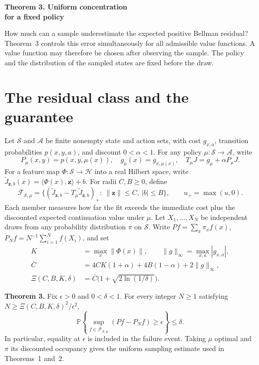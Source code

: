 \documentclass[12pt,a4paper]{article}
\newcommand{\Prob}{\mathbb P}
\newcommand{\Cbar}{\overline C}
\newcommand{\resclass}{\overline{\mathcal F}_{\!\mathcal S,\mu}}
\begin{document}
{\LARGE\bfseries Theorem 3. Uniform concentration\\[2pt] for a fixed policy\par}
\medskip
How much can a sample underestimate the expected positive Bellman residual?
Theorem~3 controls this error simultaneously for all admissible value
functions. A value function may therefore be chosen after observing the
sample. The policy and the distribution of the sampled states are fixed
before the draw.

\section*{The residual class and the guarantee}
Let \(\mathcal S\) and \(\mathcal A\) be finite nonempty state and action
sets, with cost \(g_{x,a}\), transition probabilities \(p(x,y,a)\), and
discount \(0<\alpha<1\). For any policy \(\mu:\mathcal S\to\mathcal A\), write
\[
 P_\mu(x,y)=p(x,y,\mu(x)),\quad g_\mu(x)=g_{x,\mu(x)},\quad
 T_\mu J=g_\mu+\alpha P_\mu J .
\]
For a feature map \(\Phi:\mathcal S\to\mathcal H\) into a real Hilbert space,
write \(\widetilde J_{\mathbf z,b}(x)=\langle\Phi(x),\mathbf z\rangle+b\).
For radii \(C,B\ge0\), define
\[
 \resclass=\bigl\{(\widetilde J_{\mathbf z,b}-T_\mu\widetilde J_{\mathbf z,b})_+
                 :\ \|\mathbf z\|\le C,\ |b|\le B\bigr\},\qquad u_+=\max(u,0).
\]
Each member measures how far the fit exceeds the immediate cost plus
the discounted expected continuation value under \(\mu\). Let \(X_1,\ldots,X_N\) be independent draws from any
probability distribution \(\pi\) on \(\mathcal S\). Write
\(P f=\sum_x\pi_x f(x)\), \(P_N f=N^{-1}\sum_{i=1}^N f(X_i)\), and set
\[
 \begin{aligned}
 K&=\max_x\|\Phi(x)\|,\qquad \|g\|_\infty=\max_{x,a}|g_{x,a}|,\\
 \Cbar&=4CK(1+\alpha)+4B(1-\alpha)+2\|g\|_\infty,\\
 \Xi(C,B,K,\delta)&=\Cbar\bigl(1+\sqrt{2\ln(1/\delta)}\bigr).
 \end{aligned}
\]

\textbf{Theorem 3.} Fix \(\epsilon>0\) and \(0<\delta<1\). For every integer
\(N\ge1\) satisfying \(N\ge \Xi(C,B,K,\delta)^2/\epsilon^2\),
\begin{equation}
 \Prob\!\left\{\sup_{f\in\resclass}(P f-P_N f)\ge\epsilon\right\}\le\delta .
 \tag{T3}\label{eq:theorem}
\end{equation}
In particular, equality at \(\epsilon\) is included in the failure event.
Taking \(\mu\) optimal and \(\pi\) its discounted occupancy gives the
uniform sampling estimate used in Theorems~1 and~2.
\end{document}

